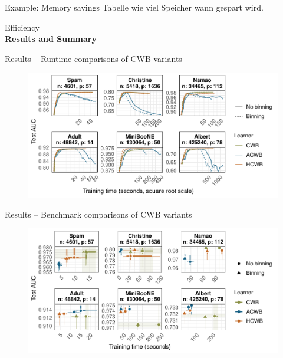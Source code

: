 \documentclass[t,10pt]{beamer}
\newcommand{\fSlide}[2]{
\begin{frame}[plain]{}%
  \vspace{4cm}%
  \Large #1\\[0.2cm]%
  {\LARGE\textbf{#2}}%
	\addtocounter{framenumber}{-1}%
\end{frame}%
}
\begin{document}
\begin{frame}{Example: Memory savings}
  Tabelle wie viel Speicher wann gespart wird.
\end{frame}

\fSlide{Efficiency}{Results and Summary}

\begin{frame}{Results -- Runtime comparisons of CWB variants}
  \begin{figure}
    \centering
    \includegraphics[width=\textwidth]{figures/fig-cacb-runtimes.pdf}
  \end{figure}
\end{frame}

\begin{frame}{Results -- Benchmark comparisons of CWB variants}
  \begin{figure}
    \centering
    \includegraphics[width=\textwidth]{figures/fig-cacb-benchmark.pdf}
  \end{figure}
\end{frame}
\end{document}
